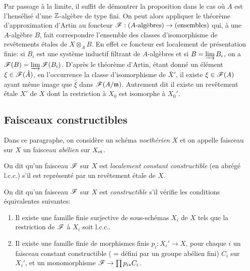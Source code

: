 \documentclass[oneside]{book}
\begin{document}
Par passage à la limite, il suffit de démontrer la proposition dans le cas 
où $A$ est l'hensélisé d'une $\mathbb{Z}$-algèbre de type fini. On peut alors 
appliquer le théorème d'approximation d'Artin au foncteur 
$\mathscr{F}:(\textnormal{$A$-algèbres}) \to (\textnormal{ensembles})$ qui, à une 
$A$-algèbre $B$, fait correspondre l'ensemble des classes d'isomorphisme de 
revêtements étales de $X\otimes_A B$. En effet ce foncteur est localement de 
présentation finie: si $B_i$ est une système inductif filtrant de 
$A$-algèbres et si $B=\varinjlim B_i$, on a $\mathscr{F}(B) = \varinjlim \mathscr{F}(B_i)$. 
D'après le théorème d'Artin, étant donné un élément 
$\xi\in \mathscr{F}(\hat A)$, en l'occurrence la classe d'isomorphisme de $\bar X'$, il 
existe $\xi\in \mathscr{F}(A)$ ayant même image que $\bar\xi$ dans $\mathscr{F}(A/\mathfrak{m})$. 
Autrement dit il existe un revêtement étale $X'$ de $X$ dont la restriction 
à $X_0$ est isomorphe à $X_0'$. 










\subsection{Faisceaux constructibles}\label{I:4-3}

Dans ce paragraphe, on considère un schéma \emph{noethérien} $X$ et on 
appelle faisceau sur $X$ un faisceau \emph{abélien} sur ${X}_{\textnormal{et}}$. 





\begin{definition}\label{I:4-3-1}
On dit qu'un faisceau $\mathscr{F}$ sur $X$ est \emph{localement constant constructible} 
(en abrégé l.c.c.) s'il est représenté par un revêtement étale de 
$X$. 
\end{definition}





\begin{definition}\label{I:4-3-2}
On dit qu'un faisceau $\mathscr{F}$ sur $X$ est \emph{constructible} s'il vérifie les 
conditions équivalentes suivantes:
\begin{enumerate}[\indent (i)]
  \item Il existe une famille finie surjective de sous-schémas $X_i$ de $X$ 
     tels que la restriction de $\mathscr{F}$ à $X_i$ soit l.c.c..
  \item Il existe une famille finie de morphismes finis $p_i:X_i'\to X$, pour 
    chaque $i$ un faisceau constant constructible ( = défini par un groupe 
    abélien fini) $C_i$ sur $X_i'$, et un monomorphisme 
    $\mathscr{F}\to \prod p_{i*} C_i$. 
\end{enumerate}
\end{definition}
\end{document}
